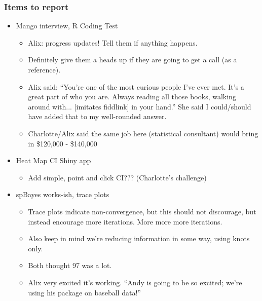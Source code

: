 \documentclass{article}
\begin{document}
\subsubsection*{Items to report}
\begin{itemize}
\item Mango interview, R Coding Test
  \begin{itemize}
  \item Alix: progress updates! Tell them if anything happens. 
  \item Definitely give them a heads up if they are going to get a call (as a reference).
  \item Alix said: ``You're one of the most curious people I've ever met. It's a great part of who you are. Always reading all those books, walking around with... [imitates fiddlink] in your hand.'' She said I could/should have added that to my well-rounded answer.
  \item Charlotte/Alix said the same job here (statistical consultant) would bring in \$120,000 - \$140,000
  \end{itemize}
\item Heat Map CI Shiny app
  \begin{itemize}
  \item Add simple, point and click CI??? (Charlotte's challenge)
  \end{itemize}
\item spBayes works-ish, trace plots
  \begin{itemize}
  \item Trace plots indicate non-convergence, but this should not discourage, but instead encourage more iterations. More more more iterations. 
  \item Also keep in mind we're reducing information in some way, using knots only.
  \item Both thought 97 was a lot.
  \item Alix very excited it's working. ``Andy is going to be so excited; we're using his package on baseball data!''
  \end{itemize}
\end{itemize}
\end{document}
